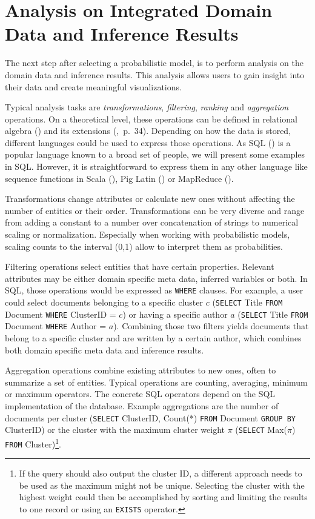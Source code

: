 \section{Analysis on Integrated Domain Data and Inference Results}

The next step after selecting a probabilistic model, is to perform analysis on the domain data and inference results. This analysis allows users to gain insight into their data and create meaningful visualizations.

Typical analysis tasks are \emph{transformations}, \emph{filtering}, \emph{ranking} and \emph{aggregation} operations. On a theoretical level, these operations can be defined in relational algebra (\cite{ozsoyouglu1987extending, klug1982equivalence}) and its extensions (\cite{rajaraman2011mining},~p.~34). Depending on how the data is stored, different languages could be used to express those operations. As SQL (\cite{iso2011sql}) is a popular language known to a broad set of people, we will present some examples in SQL. However, it is straightforward to express them in any other language like sequence functions in Scala (\cite{odersky2008programming}), Pig Latin (\cite{gates2011programming}) or MapReduce (\cite{dean2008mapreduce}).

Transformations change attributes or calculate new ones without affecting the number of entities or their order. Transformations can be very diverse and range from adding a constant to a number over concatenation of strings to numerical scaling or normalization. Especially when working with probabilistic models, scaling counts to the interval (0,1) allow to interpret them as probabilities.

Filtering operations select entities that have certain properties. Relevant attributes may be either domain specific meta data, inferred variables or both. In SQL, those operations would be expressed as \texttt{WHERE} clauses. For example, a user could select documents belonging to a specific cluster $c$ (\texttt{SELECT} Title \texttt{FROM} Document \texttt{WHERE} ClusterID = $c$) or having a specific author $a$ (\texttt{SELECT} Title \texttt{FROM} Document \texttt{WHERE} Author = $a$). Combining those two filters yields documents that belong to a specific cluster and are written by a certain author, which combines both domain specific meta data and inference results.

Aggregation operations combine existing attributes to new ones, often to summarize a set of entities. Typical operations are counting, averaging, minimum or maximum operators. The concrete SQL operators depend on the SQL implementation of the database. Example aggregations are the number of documents per cluster (\texttt{SELECT} ClusterID, Count(*) \texttt{FROM} Document \texttt{GROUP BY} ClusterID) or the cluster with the maximum cluster weight $\pi$ (\texttt{SELECT} Max($\pi$) \texttt{FROM} Cluster)\footnote{If the query should also output the cluster ID, a different approach needs to be used as the maximum might not be unique. Selecting the cluster with the highest weight could then be accomplished by sorting and limiting the results to one record or using an \texttt{EXISTS} operator.}.

